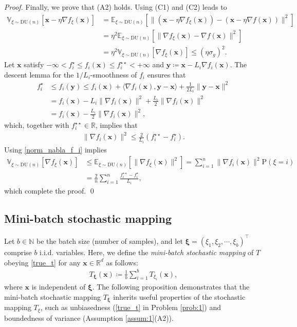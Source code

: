 \documentclass[smallextended,referee,envcountsect,]{svjour3}
\begin{document}
\begin{proof}
Finally, we prove that (A2) holds. Using (C1) and (C2) leads to 
\begin{align*}
\mathbb{V}_{\xi \sim \mathrm{DU}(n)}[\bm{x} - \eta \nabla f_\xi (\bm{x})]
&= 
\mathbb{E}_{\xi \sim \mathrm{DU}(n)}
[ \| ( \bm{x} - \eta \nabla f_\xi (\bm{x}) ) - ( \bm{x} - \eta \nabla f (\bm{x}) ) \|^{2} ]\\
&= 
\eta^{2}
\mathbb{E}_{\xi \sim \mathrm{DU}(n)} [ \|\nabla f_\xi (\bm{x}) - \nabla f (\bm{x})\|^{2}]\\
&=
\eta^{2} \mathbb{V}_{\xi \sim \mathrm{DU}(n)}
[\nabla f_\xi (\bm{x})] 
\leq 
(\eta \sigma_g)^{2}.
\end{align*}
Let $\bm{x}$ satisfy $- \infty < f_i^\star \leq f_i (\bm{x}) \leq f_i^{\star\star} < + \infty$ and $\bm{y} \coloneqq \bm{x} - L_i \nabla f_i (\bm{x})$. The descent lemma for the $1/L_i$-smoothness of $f_i$ ensures that
\begin{align*}
f_i^\star 
&\leq f_i(\bm{y}) 
\leq 
f_i(\bm{x}) + \langle \nabla f_i (\bm{x}), \bm{y} - \bm{x} \rangle
+ 
\frac{1}{2 L_i} \|\bm{y} - \bm{x}\|^2\\
&= 
f_i(\bm{x})
- L_i \| \nabla f_i (\bm{x}) \|^2
+ \frac{L_i}{2} \| \nabla f_i (\bm{x}) \|^2\\
&= 
f_i(\bm{x}) - \frac{L_i}{2} \| \nabla f_i (\bm{x}) \|^2,
\end{align*}
which, together with $f_i^{\star\star} \in \mathbb{R}$, implies that
\begin{align}\label{norm_nabla_f_i}
\| \nabla f_i (\bm{x}) \|^{2}
\leq
\frac{2}{L_i} (f_i^{\star\star} - f_i^{\star}).
\end{align}
Using \eqref{norm_nabla_f_i} implies 
\begin{align*}
\mathbb{V}_{\xi \sim \mathrm{DU}(n)} \left[ \nabla f_\xi (\bm{x}) \right]
&\leq  
\mathbb{E}_{\xi \sim \mathrm{DU}(n)} \left[ \|\nabla f_\xi (\bm{x})\|^2   \right]
=
\sum_{i=1}^n \|\nabla f_i (\bm{x})\|^2 \mathrm{P}(\xi = i)\\
&= 
\frac{2}{n} \sum_{i=1}^n
\frac{f_i^{\star\star} - f_i^{\star}}{L_i},
\end{align*}
which complete the proof.
\qed
\end{proof}

\subsection{Mini-batch stochastic mapping}
Let $b \in \mathbb{N}$ be the batch size (number of samples), and let $\bm{\xi} = (\xi_{1}, \xi_{2}, \cdots, \xi_{b})^\top$ comprise $b$ i.i.d. variables. Here, we define the {\em mini-batch stochastic mapping} of $T$ obeying \eqref{true_t} for any $\bm{x} \in \mathbb{R}^d$ as follows:
\begin{align}\label{mini_batch}
T_{\bm{\xi}}(\bm{x}) \coloneqq 
\frac{1}{b} \sum_{i=1}^b T_{\xi_{i}}(\bm{x}),
\end{align} 
where $\bm{x}$ is independent of $\bm{\xi}$. The following proposition demonstrates that the mini-batch stochastic mapping $T_{\bm{\xi}}$ inherits useful properties of the stochastic mapping $T_\xi$, such as unbiasedness (\eqref{true_t} in Problem \ref{prob:1}) and boundedness of variance (Assumption \ref{assum:1}(A2)). 
\end{document}
